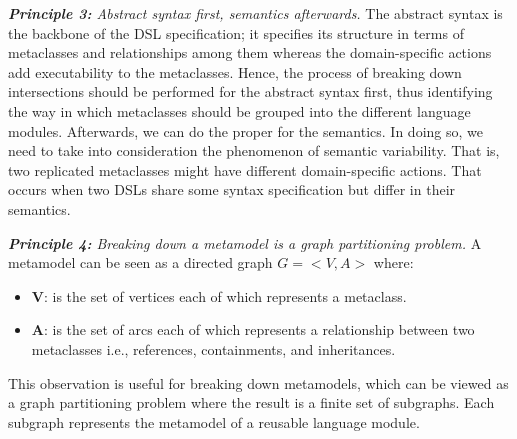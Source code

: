 

\vspace{2mm}
\textit{\textbf{Principle 3:} Abstract syntax first, semantics afterwards.} The abstract syntax is the backbone of the DSL specification; it specifies its structure in terms of metaclasses and relationships among them whereas the domain-specific actions add executability to the metaclasses. Hence, the process of breaking down intersections should be performed for the abstract syntax first, thus identifying the way in which metaclasses should be grouped into the different language modules. Afterwards, we can do the proper for the semantics. In doing so, we need to take into consideration the phenomenon of semantic variability. That is, two replicated metaclasses might have different domain-specific actions. That occurs when two DSLs share some syntax specification but differ in their semantics.

\vspace{2mm}
\textit{\textbf{Principle 4:} Breaking down a metamodel is a graph partitioning problem.} A metamodel can be seen as a directed graph $G=<V,A>$ where:

\begin{itemize}
\item \textbf{V}: is the set of vertices each of which represents a metaclass.
\item \textbf{A}: is the set of arcs each of which represents a relationship between two metaclasses i.e., references, containments, and inheritances.
\end{itemize}

This observation is useful for breaking down metamodels, which can be viewed as a graph partitioning problem where the result is a finite set of subgraphs. Each subgraph represents the metamodel of a reusable language module.

